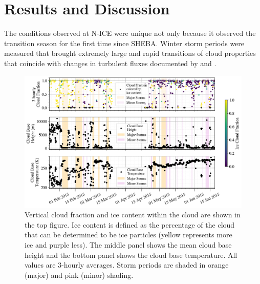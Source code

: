 \section{Results and Discussion}
The conditions observed at N-ICE were unique not only because it observed the transition season for the first time since SHEBA. Winter storm periods were measured that brought extremely large and rapid transitions of cloud properties that coincide with changes in turbulent fluxes documented by \citet{walden:2017} and \citet{graham:2017:comp}. 

\begin{figure}[t!]
    \centering
    \includegraphics[width=1\linewidth]{figures/chapter4/CloudSummary.png}
    \caption[Cloud fraction and phase, height, and temperature time series.]{Vertical cloud fraction and ice content within the cloud are shown in the top figure. Ice content is defined as the percentage of the cloud that can be determined to be ice particles (yellow represents more ice and purple less). The middle panel shows the mean cloud base height and the bottom panel shows the cloud base temperature. All values are 3-hourly averages. Storm periods are shaded in orange (major) and pink (minor) shading.}
    \label{fig:cloudmacro}
\end{figure}

